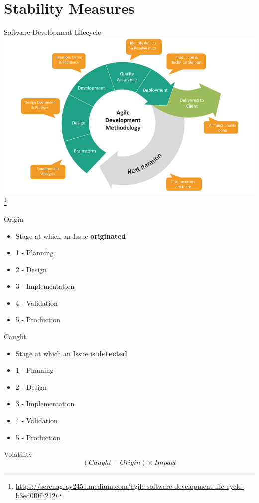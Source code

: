 \documentclass[aspectratio=169]{beamer}
\begin{document}
\section{Stability Measures}
\begin{frame}{Software Development Lifecycle}
    \centering
    \includegraphics[width=\textwidth,height=0.7\textheight,keepaspectratio]{16_agile_sdlc.png} \footnote{\url{https://serenagray2451.medium.com/agile-software-development-life-cycle-b3ed0f0f7212}}
\end{frame}
\begin{frame}{Origin}
    \begin{itemize}
        \item Stage at which an Issue \textbf{originated} 
        \item 1 - Planning
        \item 2 - Design
        \item 3 - Implementation
        \item 4 - Validation
        \item 5 - Production
    \end{itemize}
\end{frame}
\begin{frame}{Caught}
    \begin{itemize}
        \item Stage at which an Issue is \textbf{detected}
        \item 1 - Planning
        \item 2 - Design
        \item 3 - Implementation
        \item 4 - Validation
        \item 5 - Production
    \end{itemize}
\end{frame}
\begin{frame}{Volatility}
    $$(Caught - Origin) \times Impact$$
\end{frame}
\end{document}
